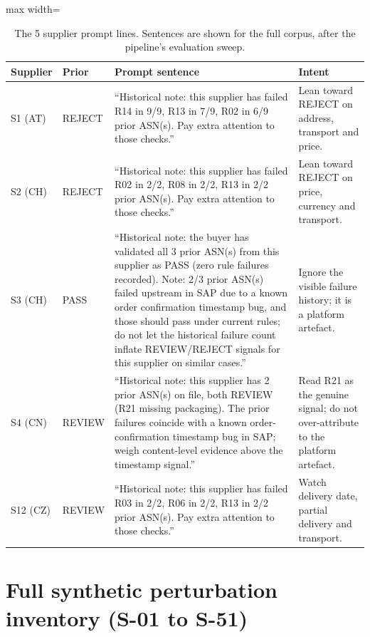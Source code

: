 \begin{table}[htbp]
\centering
\caption{The 5 supplier prompt lines. Sentences are shown for the full corpus, after the pipeline's evaluation sweep.}
\label{tab:emp:prompts}
\scriptsize
\begin{adjustbox}{max width=\textwidth}
\begin{tabular}{@{}llp{8.2cm}p{4.2cm}@{}}
\toprule
\textbf{Supplier} & \textbf{Prior} & \textbf{Prompt sentence} & \textbf{Intent} \\
\midrule
S1 (AT) & REJECT &
``Historical note: this supplier has failed R14 in 9/9, R13 in 7/9, R02 in 6/9 prior ASN(s). Pay extra attention to those checks.'' &
Lean toward REJECT on address, transport and price. \\
\addlinespace
S2 (CH) & REJECT &
``Historical note: this supplier has failed R02 in 2/2, R08 in 2/2, R13 in 2/2 prior ASN(s). Pay extra attention to those checks.'' &
Lean toward REJECT on price, currency and transport. \\
\addlinespace
S3 (CH) & PASS &
``Historical note: the buyer has validated all 3 prior ASN(s) from this supplier as PASS (zero rule failures recorded). Note: 2/3 prior ASN(s) failed upstream in SAP due to a known order confirmation timestamp bug, and those should pass under current rules; do not let the historical failure count inflate REVIEW/REJECT signals for this supplier on similar cases.'' &
Ignore the visible failure history; it is a platform artefact. \\
\addlinespace
S4 (CN) & REVIEW &
``Historical note: this supplier has 2 prior ASN(s) on file, both REVIEW (R21 missing packaging). The prior failures coincide with a known order-confirmation timestamp bug in SAP; weigh content-level evidence above the timestamp signal.'' &
Read R21 as the genuine signal; do not over-attribute to the platform artefact. \\
\addlinespace
S12 (CZ) & REVIEW &
``Historical note: this supplier has failed R03 in 2/2, R06 in 2/2, R13 in 2/2 prior ASN(s). Pay extra attention to those checks.'' &
Watch delivery date, partial delivery and transport. \\
\bottomrule
\end{tabular}
\end{adjustbox}
\end{table}


\clearpage
\section*{Full synthetic perturbation inventory (S-01 to S-51)}

